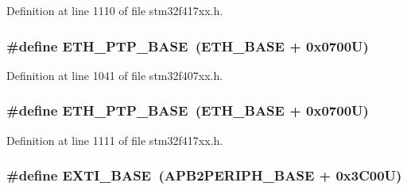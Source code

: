 Definition at line 1110 of file stm32f417xx.\+h.

\subsubsection[{\texorpdfstring{E\+T\+H\+\_\+\+P\+T\+P\+\_\+\+B\+A\+SE}{ETH_PTP_BASE}}]{\setlength{\rightskip}{0pt plus 5cm}\#define E\+T\+H\+\_\+\+P\+T\+P\+\_\+\+B\+A\+SE~({\bf E\+T\+H\+\_\+\+B\+A\+SE} + 0x0700\+U)}\hypertarget{group___peripheral__registers__structures_gaa0f60b922aeb7275c785cbaa8f94ecf0}{}\label{group___peripheral__registers__structures_gaa0f60b922aeb7275c785cbaa8f94ecf0}


Definition at line 1041 of file stm32f407xx.\+h.

\subsubsection[{\texorpdfstring{E\+T\+H\+\_\+\+P\+T\+P\+\_\+\+B\+A\+SE}{ETH_PTP_BASE}}]{\setlength{\rightskip}{0pt plus 5cm}\#define E\+T\+H\+\_\+\+P\+T\+P\+\_\+\+B\+A\+SE~({\bf E\+T\+H\+\_\+\+B\+A\+SE} + 0x0700\+U)}\hypertarget{group___peripheral__registers__structures_gaa0f60b922aeb7275c785cbaa8f94ecf0}{}\label{group___peripheral__registers__structures_gaa0f60b922aeb7275c785cbaa8f94ecf0}


Definition at line 1111 of file stm32f417xx.\+h.

\subsubsection[{\texorpdfstring{E\+X\+T\+I\+\_\+\+B\+A\+SE}{EXTI_BASE}}]{\setlength{\rightskip}{0pt plus 5cm}\#define E\+X\+T\+I\+\_\+\+B\+A\+SE~({\bf A\+P\+B2\+P\+E\+R\+I\+P\+H\+\_\+\+B\+A\+SE} + 0x3\+C00\+U)}\hypertarget{group___peripheral__registers__structures_ga87371508b3bcdcd98cd1ec629be29061}{}\label{group___peripheral__registers__structures_ga87371508b3bcdcd98cd1ec629be29061}


